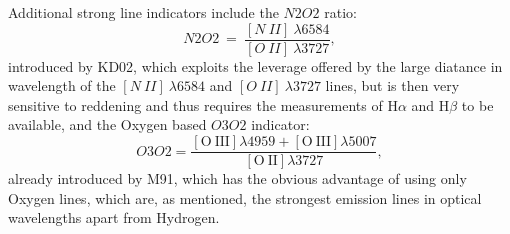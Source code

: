 \documentclass{emulateapj}
\newcommand{\oxabinline}{\ensuremath{12 + \log_{10}(O/H)}}
\newcommand{\ha}{\ensuremath{\mathrm{H}\alpha}}
\newcommand{\hb}{\ensuremath{\mathrm{H}\beta}}
\begin{document}
Additional strong line indicators include the $N2O2$ ratio:
$$N2O2 ~=~ \frac{[N~II]~\lambda 6584}{[O~II]~\lambda 3727},$$
introduced by KD02, which exploits the leverage offered by the large
diatance in wavelength of the $[N~II]~\lambda 6584$ and
$[O~II]~\lambda3727$ lines, but is then very sensitive to reddening
and thus requires the measurements of $\ha$ and $\hb$ to be available,
and the Oxygen based $O3O2$ indicator:
$$O3O2=\frac{\mathrm{[O~III]}\lambda4959+\mathrm{[O~III]}\lambda5007}{\mathrm{[O~II]}\lambda3727},$$
already introduced by M91, which has the obvious advantage of using
only Oxygen lines, which are, as mentioned, the strongest emission
lines in optical wavelengths apart from Hydrogen.
 
\end{document}
